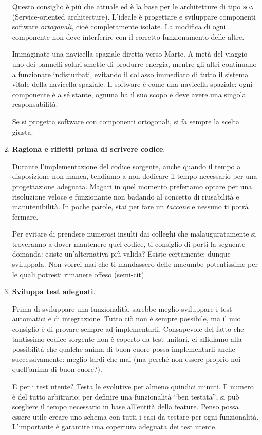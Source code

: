 \begin{enumerate}
Questo consiglio è più che attuale ed è la base per le architetture di tipo \textsc{soa} (Service-oriented architecture). L’ideale è progettare e sviluppare componenti software \emph{ortogonali}, cioè completamente isolate. La modifica di ogni componente non deve interferire con il corretto funzionamento delle altre.

Immaginate una navicella spaziale diretta verso Marte. A metà del viaggio uno dei pannelli solari smette di produrre energia, mentre gli altri continuano a funzionare indisturbati, evitando il collasso immediato di tutto il sistema vitale della navicella spaziale. Il software è come una navicella spaziale: ogni componente è a sé stante, ognuna ha il suo scopo e deve avere una singola responsabilità.

Se si progetta software con componenti ortogonali, si fa sempre la scelta giusta.

\item \textbf{Ragiona e rifletti prima di scrivere codice}.

Durante l’implementazione del codice sorgente, anche quando il tempo a disposizione non manca, tendiamo a non dedicare il tempo necessario per una progettazione adeguata. Magari in quel momento preferiamo optare per una risoluzione veloce e funzionante non badando al concetto di riusabilità e manutenibilità. In poche parole, stai per fare un \emph{taccone} e nessuno ti potrà fermare. 

Per evitare di prendere numerosi insulti dai colleghi che malauguratamente si troveranno a dover mantenere quel codice, ti consiglio di porti la seguente domanda: esiste un’alternativa più valida? Esiste certamente; dunque sviluppala. Non vorrei mai che ti mandassero delle macumbe potentissime per le quali potresti rimanere offeso (semi-cit).

\item \textbf{Sviluppa test adeguati}.

Prima di sviluppare una funzionalità, sarebbe meglio sviluppare i test automatici e di integrazione. Tutto ciò non è sempre possibile, ma il mio consiglio è di provare sempre ad implementarli. Consapevole del fatto che tantissimo codice sorgente non è coperto da test unitari, ci affidiamo alla possibilità che qualche anima di buon cuore possa implementarli anche successivamente: meglio tardi che mai (ma perché non essere proprio noi quell’anima di buon cuore?).

E per i test utente? Testa le evolutive per almeno quindici minuti. Il numero è del tutto arbitrario; per definire una funzionalità “ben testata”, si può scegliere il tempo necessario in base all’entità della feature. Penso possa essere utile creare uno schema con tutti i casi da testare per ogni funzionalità. L’importante è garantire una copertura adeguata dei test utente.


\end{enumerate}
